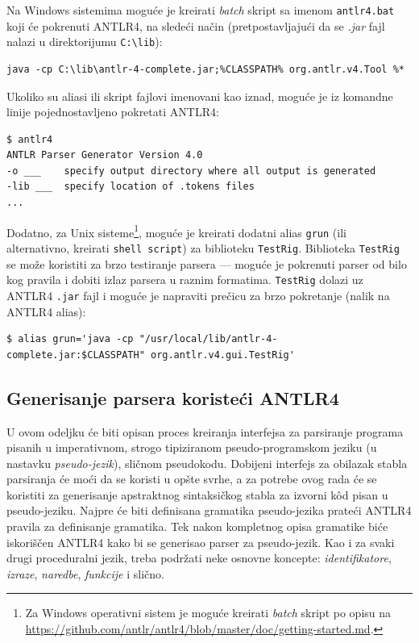 Na Windows sistemima moguće je kreirati \emph{batch} skript sa imenom \texttt{antlr4.bat} koji će pokrenuti ANTLR4, na sledeći način (pretpostavljajući da se \emph{.jar} fajl nalazi u direktorijumu \texttt{C:\textbackslash{}lib}):
\begin{lstlisting}[language={}]
java -cp C:\lib\antlr-4-complete.jar;%CLASSPATH% org.antlr.v4.Tool %*
\end{lstlisting}

Ukoliko su aliasi ili skript fajlovi imenovani kao iznad, moguće je iz komandne linije pojednostavljeno pokretati ANTLR4:  
\begin{lstlisting}[language={}]
$ antlr4
ANTLR Parser Generator Version 4.0
-o ___    specify output directory where all output is generated
-lib ___  specify location of .tokens files
...
\end{lstlisting}

Dodatno, za Unix sisteme\footnote{Za Windows operativni sistem je moguće kreirati \emph{batch} skript po opisu na \url{https://github.com/antlr/antlr4/blob/master/doc/getting-started.md}.}, moguće je kreirati dodatni alias \texttt{grun} (ili alternativno, kreirati \texttt{shell script}) za biblioteku \texttt{TestRig}. Biblioteka \texttt{TestRig} se može koristiti za brzo testiranje parsera --- moguće je pokrenuti parser od bilo kog pravila i dobiti izlaz parsera u raznim formatima. \texttt{TestRig} dolazi uz ANTLR4 \texttt{.jar} fajl i moguće je napraviti prečicu za brzo pokretanje (nalik na ANTLR4 alias):
\begin{lstlisting}[language={}]
$ alias grun='java -cp "/usr/local/lib/antlr-4-complete.jar:$CLASSPATH" org.antlr.v4.gui.TestRig'
\end{lstlisting}


\subsection{Generisanje parsera koristeći ANTLR4}
\label{subsec:ANTLRParserGeneration}

U ovom odeljku će biti opisan proces kreiranja interfejsa za parsiranje programa pisanih u imperativnom, strogo tipiziranom pseudo-programskom jeziku (u nastavku \emph{pseudo-jezik}), sličnom pseudokodu. Dobijeni interfejs za obilazak stabla parsiranja će moći da se koristi u opšte svrhe, a za potrebe ovog rada će se koristiti za generisanje apstraktnog sintaksičkog stabla za izvorni k\^od pisan u pseudo-jeziku. Najpre će biti definisana gramatika pseudo-jezika prateći ANTLR4 pravila za definisanje gramatika. Tek nakon kompletnog opisa gramatike biće iskoriščen ANTLR4 kako bi se generisao parser za pseudo-jezik. Kao i za svaki drugi proceduralni jezik, treba podržati neke osnovne koncepte: \emph{identifikatore}, \emph{izraze}, \emph{naredbe}, \emph{funkcije} i slično.

